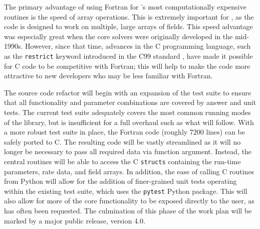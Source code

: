 The primary advantage of using Fortran for \grackle{}'s most
computationally expensive routines is the speed of array operations.
This is extremely important for \grackle{}, as the code is designed to
work on multiple, large arrays of fields.  This speed advantage was
especially great when the core solvers were originally developed in
the mid-1990s.  However, since that time, advances in the C
programming language, such as the \texttt{restrict} keyword introduced
in the C99 standard \citep{c99}, have made it possible for C code to
be competitive with Fortran; this will help to make the code more attractive to
new developers who may be less familiar with Fortran.

The source code refactor will begin with an expansion of the
test suite to ensure that all functionality and parameter
combinations are covered by answer and unit tests.  The current
test suite adequately covers the most common running modes of the
library, but is insufficient for a full overhaul such as what will
follow.  With a more robust test suite in place, the Fortran code (roughly 7200
lines) can be safely ported to C.  The resulting code will
be vastly streamlined as it will no longer be necessary to pass all
required data via function argument.  Instead, the central routines
will be able to access the C \texttt{structs} containing the run-time
parameters, rate data, and field arrays.  In addition, the ease of
calling C routines from Python will allow for the addition of
finer-grained unit tests operating within the existing test suite,
which uses the \texttt{pytest} Python package.  This will also allow
for more of the core functionality to be exposed directly to the user,
as has often been requested.  The culmination of this phase of the
work plan will be marked by a major public release, \grackle{} version
4.0.


